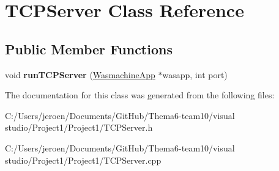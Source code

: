 \hypertarget{class_t_c_p_server}{}\section{T\+C\+P\+Server Class Reference}
\label{class_t_c_p_server}
\subsection*{Public Member Functions}
\begin{DoxyCompactItemize}
\item 
void {\bfseries run\+T\+C\+P\+Server} (\hyperlink{class_wasmachine_app}{Wasmachine\+App} $\ast$wasapp, int port)\hypertarget{class_t_c_p_server_aa8c01dc90f11b2747b98328210db805a}{}\label{class_t_c_p_server_aa8c01dc90f11b2747b98328210db805a}

\end{DoxyCompactItemize}


The documentation for this class was generated from the following files\+:\begin{DoxyCompactItemize}
\item 
C\+:/\+Users/jeroen/\+Documents/\+Git\+Hub/\+Thema6-\/team10/visual studio/\+Project1/\+Project1/T\+C\+P\+Server.\+h\item 
C\+:/\+Users/jeroen/\+Documents/\+Git\+Hub/\+Thema6-\/team10/visual studio/\+Project1/\+Project1/T\+C\+P\+Server.\+cpp\end{DoxyCompactItemize}
